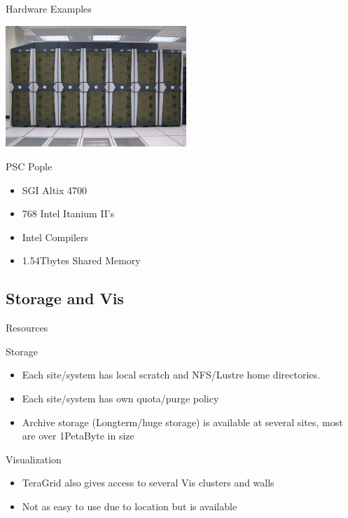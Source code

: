 \documentclass[handout]{beamer}
\begin{document}
  \begin{frame}{Hardware Examples}
   \begin{center}\includegraphics[height=1.80in]{pople}\end{center}
   \begin{block}{PSC Pople}
    \begin{itemize}
     \item SGI Altix 4700
     \item 768 Intel Itanium II's
     \item Intel Compilers
     \item 1.54Tbytes Shared Memory
    \end{itemize}
   \end{block}
  \end{frame}


  \subsection{Storage and Vis}
  \begin{frame}{Resources}
   \begin{block}{Storage}
     \begin{itemize}
      \item Each site/system has local scratch and NFS/Lustre home directories.
      \item Each site/system has own quota/purge policy
      \item Archive storage (Longterm/huge storage) is available at several sites, most are over 1PetaByte in size
     \end{itemize}
   \end{block}
   \begin{block}{Visualization}
   \begin{itemize}
    \item TeraGrid also gives access to several Vis clusters and walls
    \item Not as easy to use due to location but is available
   \end{itemize}
   \end{block}
  \end{frame}
\end{document}
